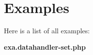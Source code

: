 \section{Examples}
Here is a list of all examples:\begin{DoxyCompactItemize}
\item 
{\bf exa.datahandler-\/set.php}
\end{DoxyCompactItemize}
